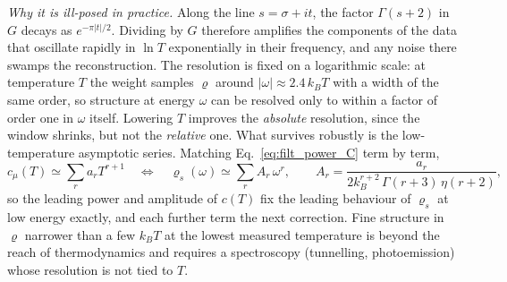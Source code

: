 \documentclass[10pt,a4paper]{article}
\theoremstyle{plain}
\theoremstyle{remark}
\begin{document}
\emph{Why it is ill-posed in practice.} Along the line $ s = \sigma + it $, the
factor $ \Gamma(s+2) $ in $ G $ decays as $ e^{-\pi|t|/2} $. Dividing by $ G $ therefore
amplifies the components of the data that oscillate rapidly in $ \ln T $
exponentially in their frequency, and any noise there swamps the reconstruction.
The resolution is fixed on a logarithmic scale: at temperature $ T $ the weight
samples $ \varrho $ around $ |\omega| \approx 2.4\,k_BT $ with a width of the same order, so
structure at energy $ \omega $ can be resolved only to within a factor of order one
in $ \omega $ itself. Lowering $ T $ improves the \emph{absolute} resolution, since the
window shrinks, but not the \emph{relative} one. What survives robustly is the
low-temperature asymptotic series. Matching Eq.~\eqref{eq:filt_power_C} term by term,
\[
  c_\mu(T) \simeq \sum_r a_r T^{r+1}
  \quad\Longleftrightarrow\quad
  \varrho_s(\omega) \simeq \sum_r A_r\,\omega^{r},
  \qquad
  A_r = \frac{a_r}{2k_B^{r+2}\,\Gamma(r+3)\,\eta(r+2)} ,
\]
so the leading power and amplitude of $ c(T) $ fix the leading behaviour of $ \varrho_s $
at low energy exactly, and each further term the next correction. Fine structure
in $ \varrho $ narrower than a few $ k_BT $ at the lowest measured temperature is beyond the
reach of thermodynamics and requires a spectroscopy (tunnelling, photoemission)
whose resolution is not tied to $ T $.
\end{document}
